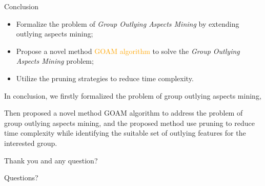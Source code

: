\documentclass[
size=14pt,
paper=smartboard,  %
mode=present, 		%
display=slides, 	%
style=tuliplab,  	%
pauseslide,
fleqn,leqno]{powerdot}
\begin{document}
\begin{slide}[toc=,bm=]{Conclusion}
	\begin{itemize}
		\item
		\smallskip
		Formalize the problem of \emph{Group Outlying Aspects Mining} by
		extending outlying aspects mining;
		
		\item
		\smallskip
		Propose a novel method \textcolor{orange}{GOAM algorithm} to solve the
		\emph{Group Outlying Aspects Mining} problem;
		
		\item
		\smallskip
		Utilize the pruning strategies to reduce time complexity.
		
	\end{itemize}
	
	\begin{note}
		In conclusion,
		we firstly formalized the problem of
		group outlying aspects mining,
		
		Then proposed a novel method GOAM algorithm to address the problem of
		group outlying aspects mining,
		and the proposed method use pruning to reduce time complexity
		while identifying the suitable set of outlying features for the interested group.
		
		Thank you and any question?
	\end{note}
	
\end{slide}


%
\begin{slide}[toc=,bm=]{Questions?}
	\begin{center}
		\begin{figure}
		\end{figure}
	\end{center}
\end{slide}
\end{document}
